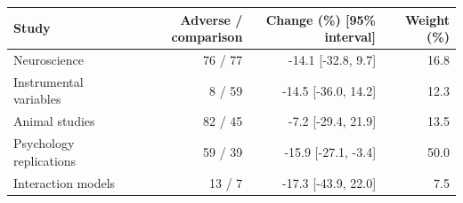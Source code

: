 \begin{tabular}{lrrr}
\toprule
Study & Adverse / comparison & Change (\%) [95\% interval] & Weight (\%) \\
\midrule
Neuroscience & 76 / 77 & -14.1 [-32.8, 9.7] & 16.8 \\
Instrumental variables & 8 / 59 & -14.5 [-36.0, 14.2] & 12.3 \\
Animal studies & 82 / 45 & -7.2 [-29.4, 21.9] & 13.5 \\
Psychology replications & 59 / 39 & -15.9 [-27.1, -3.4] & 50.0 \\
Interaction models & 13 / 7 & -17.3 [-43.9, 22.0] & 7.5 \\
\bottomrule
\end{tabular}
